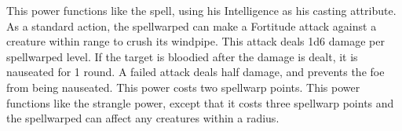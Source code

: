 This power functions like the  spell, using his Intelligence as his casting attribute.
 As a standard action, the spellwarped can make a Fortitude attack against a creature within \rngclose range to crush its windpipe. This attack deals 1d6 damage per spellwarped level. If the target is bloodied after the damage is dealt, it is nauseated for 1 round. A failed attack deals half damage, and prevents the foe from being nauseated. This power costs two spellwarp points.
 This power functions like the strangle power, except that it costs three spellwarp points and the spellwarped can affect any creatures within a \areasmall radius.

